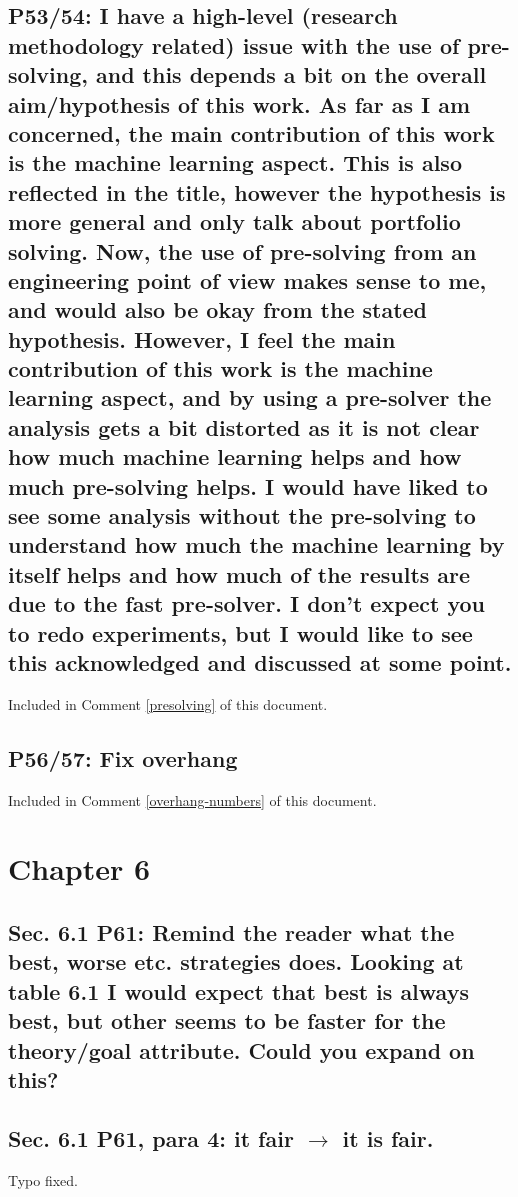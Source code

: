 \documentclass[]{article}
\begin{document}
\subsection{P53/54: I have a high-level (research methodology related) issue with the use of pre-solving, and this depends a bit on the overall aim/hypothesis of this work. As far as I am concerned, the main contribution of this work is the machine learning aspect. This is also reflected in the title, however the hypothesis is more general and only talk about portfolio solving. Now, the use of pre-solving from an engineering point of view makes sense to me, and would also be okay from the stated hypothesis. However, I feel the main contribution of this work is the machine learning aspect, and by using a pre-solver the analysis gets a bit distorted as it is not clear how much machine learning helps and how much pre-solving helps. I would have liked to see some analysis without the pre-solving to understand how much the machine learning by itself helps and how much of the results are due to the fast pre-solver. I don't expect you to redo experiments, but I would like to see this acknowledged and discussed at some point.}

Included in Comment \ref{presolving} of this document.

\subsection{P56/57: Fix overhang}

Included in Comment \ref{overhang-numbers} of this document.

\section{Chapter 6}

\subsection{Sec. 6.1 P61: Remind the reader what the best, worse etc. strategies does. Looking at table 6.1 I would expect that best is always best, but other seems to be faster for the theory/goal attribute. Could you expand on this?}

\subsection{Sec. 6.1 P61, para 4: it fair $\rightarrow$ it is fair.}

Typo fixed.
\end{document}
